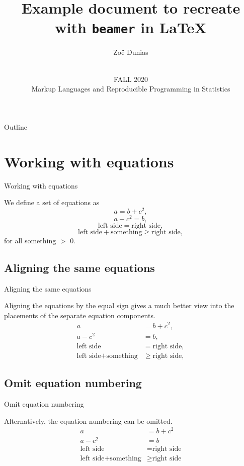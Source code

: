 \documentclass[aspectratio = 169]{beamer}
\title{Example document to recreate with \texttt{beamer} in \LaTeX}
\author{Zo\"e Dunias}
\date{\vspace{.5 in}\\FALL 2020\\ Markup Languages and Reproducible Programming in Statistics \vskip6mm}
\begin{document}
\titlepage

\begin{frame}{Outline}

\tableofcontents

\end{frame}

\section{Working with equations}
\begin{frame}{Working with equations}

We define a set of equations as
\begin{equation}
a = b + c^2,
\end{equation}
\begin{equation}
a - c^2 = b,
\end{equation}
\begin{equation}
\text{left side} = \text{right side},
\end{equation}
\begin{equation}
\text{left side} + \text{something} \geq \text{right side},
\end{equation}
for all something $>$ 0.

\end{frame}

\subsection{Aligning the same equations}
\begin{frame}{Aligning the same equations}

Aligning the equations by the equal sign gives a much better view into the placements of the separate equation components.
\begin{align}
a &= b + c^2,\\
a - c^2 &= b,\\
\text{left side} &= \text{right side},\\
\text{left side} + \text{something} &\geq \text{right side},
\end{align}

\end{frame}

\subsection{Omit equation numbering}
\begin{frame}{Omit equation numbering}

Alternatively, the equation numbering can be omitted.
\begin{align*}
a &= b + c^2\\
a - c^2 &= b\\
\text{left side} &= \text{right side}\\
\text{left side} + \text{something} &\geq \text{right side}
\end{align*}

\end{frame}
\end{document}
